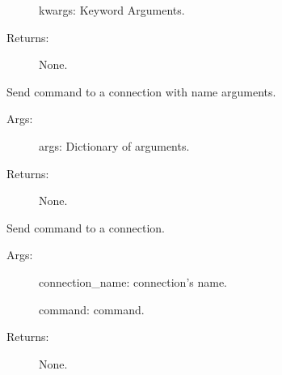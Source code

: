 \documentclass[letterpaper,10pt,english]{sphinxmanual}
\begin{document}
\begin{fulllineitems}
\begin{fulllineitems}
\begin{description}
\sphinxAtStartPar
kwargs:   Keyword Arguments.

\item[{Returns:}] \leavevmode
\sphinxAtStartPar
None.

\end{description}

\end{fulllineitems}


\begin{fulllineitems}
\label{\detokenize{QConnectBase:QConnectBase.connection_manager.ConnectionManager.send_command_named_args}}
\sphinxAtStartPar
Send command to a connection with name arguments.
\begin{description}
\item[{Args:}] \leavevmode
\sphinxAtStartPar
args: Dictionary of arguments.

\item[{Returns:}] \leavevmode
\sphinxAtStartPar
None.

\end{description}

\end{fulllineitems}


\begin{fulllineitems}
\label{\detokenize{QConnectBase:QConnectBase.connection_manager.ConnectionManager.send_command_unnamed_args}}
\sphinxAtStartPar
Send command to a connection.
\begin{description}
\item[{Args:}] \leavevmode
\sphinxAtStartPar
connection\_name: connection’s name.

\sphinxAtStartPar
command: command.

\item[{Returns:}] \leavevmode
\sphinxAtStartPar
None.


\end{description}
\end{fulllineitems}
\end{fulllineitems}
\end{document}
